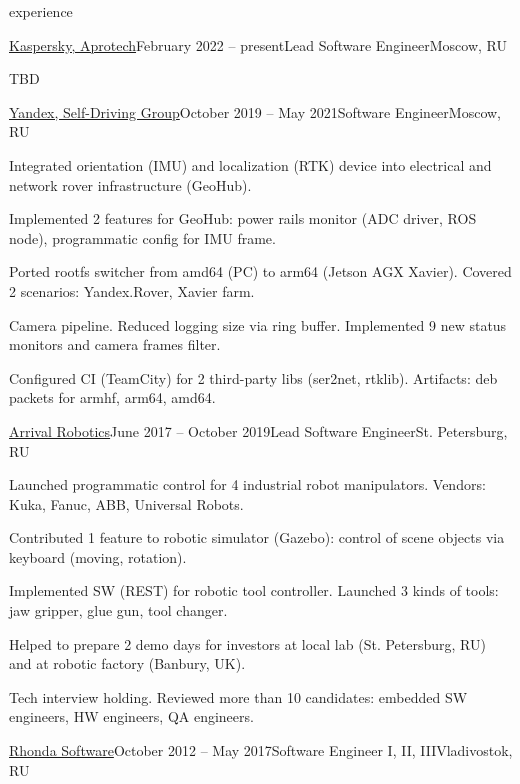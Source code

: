 \documentclass{template}
\begin{document}
\begin{rSection}{experience}
\begin{rCompany}{\href{https://www.aprotech.ru/}{Kaspersky, Aprotech}}{February 2022 -- present}{Lead Software Engineer}{Moscow, RU}

\item TBD

\end{rCompany}
\begin{rCompany}{\href{https://sdc.yandex.com/}{Yandex, Self-Driving Group}}{October 2019 -- May 2021}{Software Engineer}{Moscow, RU}

\item Integrated orientation (IMU) and localization (RTK) device into electrical and network rover infrastructure (GeoHub).
\item Implemented 2 features for GeoHub: power rails monitor (ADC driver, ROS node), programmatic config for IMU frame.
\item Ported rootfs switcher from amd64 (PC) to arm64 (Jetson AGX Xavier). Covered 2 scenarios: Yandex.Rover, Xavier farm.
\item Camera pipeline. Reduced logging size via ring buffer. Implemented 9 new status monitors and camera frames filter.
\item Configured CI (TeamCity) for 2 third-party libs (ser2net, rtklib). Artifacts: deb packets for armhf, arm64, amd64.

\end{rCompany}
\begin{rCompany}{\href{https://arrival.com/}{Arrival Robotics}}{June 2017 -- October 2019}{Lead Software Engineer}{St. Petersburg, RU}

\item Launched programmatic control for 4 industrial robot manipulators. Vendors: Kuka, Fanuc, ABB, Universal Robots.
\item Contributed 1 feature to robotic simulator (Gazebo): control of scene objects via keyboard (moving, rotation).
\item Implemented SW (REST) for robotic tool controller. Launched 3 kinds of tools: jaw gripper, glue gun, tool changer.
\item Helped to prepare 2 demo days for investors at local lab (St. Petersburg, RU) and at robotic factory (Banbury, UK).
\item Tech interview holding. Reviewed more than 10 candidates: embedded SW engineers, HW engineers, QA engineers.

\end{rCompany}
\begin{rCompany}{\href{http://www.rhondasoftware.com}{Rhonda Software}}{October 2012 -- May 2017}{Software Engineer I, II, III}{Vladivostok, RU}


\end{rCompany}
\end{rSection}
\end{document}
